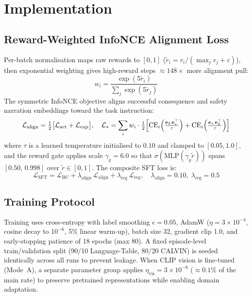 \documentclass{article}
\begin{document}
\section{Implementation}
\label{sec:training}

\subsection{Reward-Weighted InfoNCE Alignment Loss}
\label{sec:alignment}

Per-batch normalisation maps raw rewards to $[0,1]$ ($\tilde{r}_i = r_i /
(\max_j r_j + \varepsilon)$), then exponential weighting gives high-reward
steps ${\approx}148{\times}$ more alignment pull:
\begin{equation}
  w_i = \frac{\exp(5\tilde{r}_i)}{\sum_j \exp(5\tilde{r}_j)}
  \label{eq:exp_weight}
\end{equation}
The symmetric InfoNCE objective aligns successful consequence and safety
narration embeddings toward the task instruction:
\begin{equation}
  \mathcal{L}_{\mathrm{align}}
  = \tfrac{1}{2}\bigl[\mathcal{L}_{\mathrm{act}} + \mathcal{L}_{\mathrm{exp}}\bigr],
  \quad
  \mathcal{L}_{*}
  = \sum_{i} w_i \cdot
    \tfrac{1}{2}\Bigl[
      \mathrm{CE}_i\!\left(\tfrac{\mathbf{e}_2\,\mathbf{e}_{*}^{\top}}{\tau}\right)
    + \mathrm{CE}_i\!\left(\tfrac{\mathbf{e}_{*}\,\mathbf{e}_2^{\top}}{\tau}\right)
    \Bigr]
  \label{eq:infonce}
\end{equation}
where $\tau$ is a learned temperature initialised to $0.10$ and clamped to
$[0.05, 1.0]$, and the reward gate applies scale $\gamma_g{=}6.0$ so that
$\sigma(\mathrm{MLP}(\gamma_g\tilde{r}))$ spans $[0.50,\,0.998]$ over
$\tilde{r}\!\in\![0,1]$.
The composite SFT loss is:
\begin{equation}
  \mathcal{L}_{\mathrm{SFT}}
  = \mathcal{L}_{\mathrm{BC}}
  + \lambda_{\mathrm{align}}\,\mathcal{L}_{\mathrm{align}}
  + \lambda_{\mathrm{reg}}\,\mathcal{L}_{\mathrm{reg}},
  \quad \lambda_{\mathrm{align}}{=}0.10,\;\lambda_{\mathrm{reg}}{=}0.5
  \label{eq:sft_loss}
\end{equation}

\subsection{Training Protocol}
Training uses cross-entropy with label smoothing $\epsilon{=}0.05$,
AdamW ($\eta{=}3{\times}10^{-4}$, cosine decay to $10^{-6}$, 5\% linear
warm-up), batch size 32, gradient clip 1.0, and early-stopping patience of 18
epochs (max 80).
A fixed episode-level train/validation split (90/10 Language-Table, 80/20
CALVIN) is seeded identically across all runs to prevent leakage.
When CLIP vision is fine-tuned (Mode~A), a separate parameter group applies
$\eta_{\mathrm{vis}}{=}3{\times}10^{-6}$ (${\approx}0.1\%$ of the main rate)
to preserve pretrained representations while enabling domain adaptation.
\end{document}
